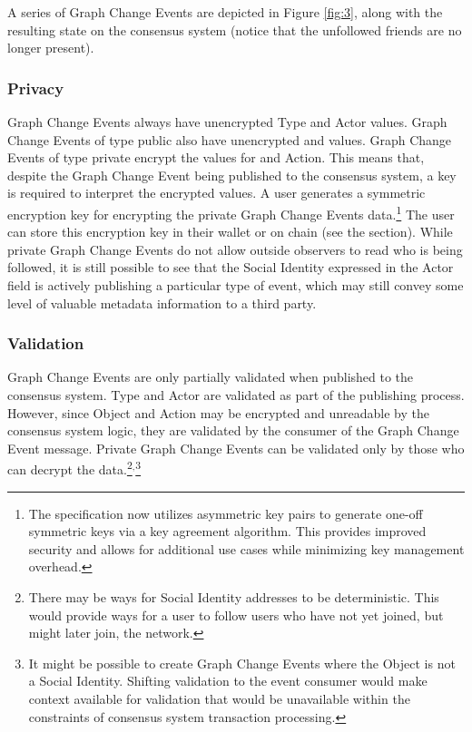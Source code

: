 \documentclass[12pt,letterpaper]{article}
\begin{document}
A series of Graph Change Events are depicted in Figure \ref{fig:3}, along with the
resulting state on the consensus system (notice that the unfollowed friends are no longer
present).

\subsubsection{Privacy}

Graph Change Events always have unencrypted Type and Actor values. Graph Change Events of
type public also have unencrypted  and  values. Graph Change Events
of type private encrypt the values for  and Action. This means that, despite the
Graph Change Event being published to the consensus system, a key is required to interpret
the encrypted values. A user generates a symmetric encryption key for encrypting the private
Graph Change Events data.\footnote{The specification now utilizes asymmetric key pairs to
  generate one-off symmetric keys via a key agreement algorithm. This provides improved
  security and allows for additional use cases while minimizing key management overhead.}
The user can store this encryption key in their wallet or on chain
(see the  section).  While private Graph Change Events do not allow outside
observers to read who is being followed, it is still possible to see that the Social
Identity expressed in the Actor field is actively publishing a particular type of event,
which may still convey some level of valuable metadata information to a third party.

\subsubsection{Validation}

Graph Change Events are only partially validated when published to the consensus
system. Type and Actor are validated as part of the publishing process. However, since
Object and Action may be encrypted and unreadable by the consensus system logic, they are
validated by the consumer of the Graph Change Event message. Private Graph Change Events can
be validated only by those who can decrypt the data.\footnote{There may be ways for Social
  Identity addresses to be deterministic. This would provide ways for a user to follow users
  who have not yet joined, but might later join, the network.}$^{,}$\footnote{It might be
  possible to create Graph Change Events where the Object is not a Social Identity.
  Shifting validation to the event consumer would make context available for validation that
  would be unavailable within the constraints of consensus system transaction processing.}
\end{document}

